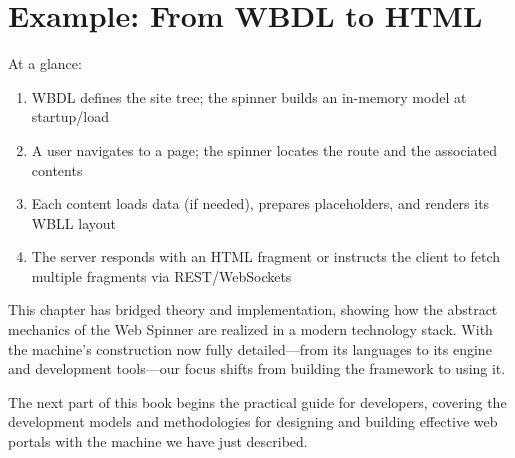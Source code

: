 \section{Example: From WBDL to HTML}
At a glance:
\begin{enumerate}
	\item WBDL defines the site tree; the spinner builds an in-memory model at startup/load
	\item A user navigates to a page; the spinner locates the route and the associated contents
	\item Each content loads data (if needed), prepares placeholders, and renders its WBLL layout
	\item The server responds with an HTML fragment or instructs the client to fetch multiple fragments via REST/WebSockets
\end{enumerate}

\noindent This chapter has bridged theory and implementation, showing how the abstract mechanics of the Web Spinner are realized in a modern technology stack. With the machine's construction now fully detailed—from its languages to its engine and development tools—our focus shifts from building the framework to using it.

The next part of this book begins the practical guide for developers, covering the development models and methodologies for designing and building effective web portals with the machine we have just described.
